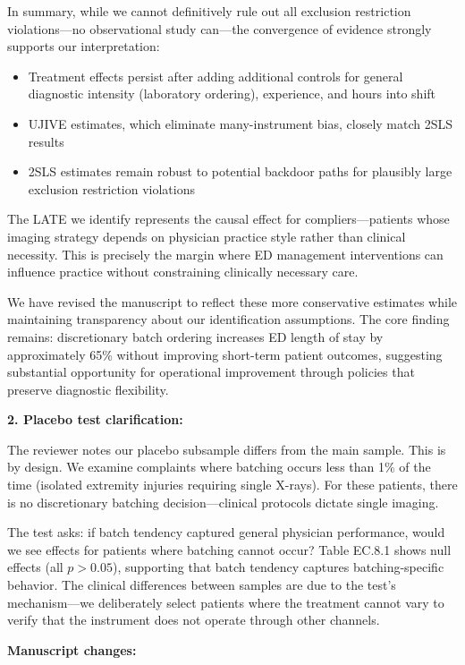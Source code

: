\documentclass[11pt]{article}
\newcommand{\1}{\hbox{\rm 1\kern-.35em 1}}
\begin{document}
In summary, while we cannot definitively rule out all exclusion restriction violations---no observational study can---the convergence of evidence strongly supports our interpretation:

\begin{itemize}
\item Treatment effects persist after adding additional controls for general diagnostic intensity (laboratory ordering), experience, and hours into shift
\item UJIVE estimates, which eliminate many-instrument bias, closely match 2SLS results
\item 2SLS estimates remain robust to potential backdoor paths for plausibly large exclusion restriction violations
\end{itemize}

The LATE we identify represents the causal effect for compliers---patients whose imaging strategy depends on physician practice style rather than clinical necessity. This is precisely the margin where ED management interventions can influence practice without constraining clinically necessary care.

We have revised the manuscript to reflect these more conservative estimates while maintaining transparency about our identification assumptions. The core finding remains: discretionary batch ordering increases ED length of stay by approximately 65\% without improving short-term patient outcomes, suggesting substantial opportunity for operational improvement through policies that preserve diagnostic flexibility.


\textbf{2. Placebo test clarification:}

The reviewer notes our placebo subsample differs from the main sample. This is by design. We examine complaints where batching occurs less than 1\% of the time (isolated extremity injuries requiring single X-rays). For these patients, there is no discretionary batching decision—clinical protocols dictate single imaging.

The test asks: if batch tendency captured general physician performance, would we see effects for patients where batching cannot occur? Table EC.8.1 shows null effects (all $p>0.05$), supporting that batch tendency captures batching-specific behavior. The clinical differences between samples are due to the test's mechanism—we deliberately select patients where the treatment cannot vary to verify that the instrument does not operate through other channels.

\textbf{Manuscript changes:}
\end{document}
